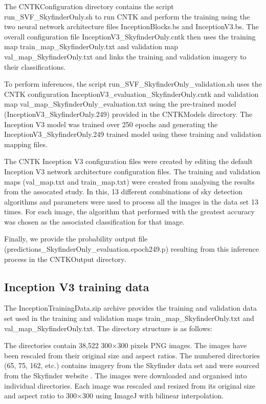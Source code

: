 \documentclass[final,3p,times,authoryear]{elsarticle}
\begin{document}

The CNTKConfiguration directory contains the script run\_SVF\_SkyfinderOnly.sh to run CNTK and perform the training using the two neural network architecture files InceptionBlocks.bs and InceptionV3.bs. The overall configuration file InceptionV3\_SkyfinderOnly.cntk then uses the training map train\_map\_SkyfinderOnly.txt and validation map val\_map\_SkyfinderOnly.txt and links the training and validation imagery to their classifications.

To perform inferences, the script run\_SVF\_SkyfinderOnly\_validation.sh uses the \\CNTK configuration InceptionV3\_evaluation\_SkyfinderOnly.cntk and validation map val\_map\_SkyfinderOnly\_evaluation.txt using the pre-trained model (InceptionV3\_SkyfinderOnly.249) provided in the CNTKModels directory. The Inception V3 model was trained over 250 epochs and generating the InceptionV3\_SkyfinderOnly.249 trained model using these training and validation mapping files.

The CNTK Inception V3 configuration files were created by editing the default Inception V3 network architecture configuration files. The training and validation maps (val\_map.txt and train\_map.txt) were created from analysing the results from the assocated study. In this, 13 different combinations of sky detection algorithms and parameters were used to process all the images in the data set 13 times. For each image, the algorithm that performed with the greatest accuracy was chosen as the associated classification for that image. 

Finally, we provide the probability output file (predictions\_SkyfinderOnly\_evaluation.epoch249.p) resulting from this inference process in the CNTKOutput directory.

\subsection{Inception V3 training data}\label{sec:trainingData}
The InceptionTrainingData.zip archive provides the training and validation data set used in the training and validation maps train\_map\_SkyfinderOnly.txt and val\_map\_SkyfinderOnly.txt. The directory structure is as follows:


The directories contain 38,522 300$\times$300 pixels PNG images. The images have been rescaled from their original size and aspect ratios. The numbered directories (65, 75, 162, etc.) contains imagery from the Skyfinder data set and were sourced from the Skyfinder website  \citep{Mihail2015}. The images were downloaded and organised into individual directories. Each image was rescaled and resized from its original size and aspect ratio to 300$\times$300 using ImageJ \citep{Rueden2017} with bilinear interpolation.
\end{document}
